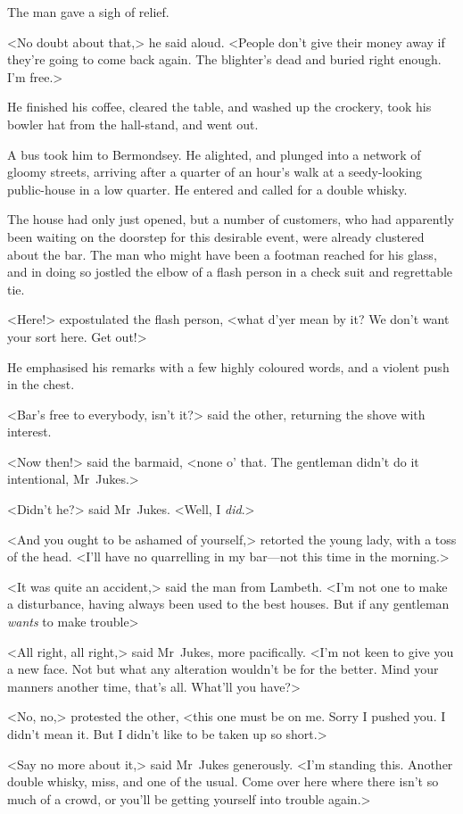 The man gave a sigh of relief.

<No doubt about that,> he said aloud. <People don't give their money away if they're going to come back again. The blighter's dead and buried right enough. I'm free.>

He finished his coffee, cleared the table, and washed up the crockery, took his bowler hat from the hall-stand, and went out.

A bus took him to Bermondsey. He alighted, and plunged into a network of gloomy streets, arriving after a quarter of an hour's walk at a seedy-looking public-house in a low quarter. He entered and called for a double whisky.

The house had only just opened, but a number of customers, who had apparently been waiting on the doorstep for this desirable event, were already clustered about the bar. The man who might have been a footman reached for his glass, and in doing so jostled the elbow of a flash person in a check suit and regrettable tie.

<Here!> expostulated the flash person, <what d'yer mean by it? We don't want your sort here. Get out!>

He emphasised his remarks with a few highly coloured words, and a violent push in the chest.

<Bar's free to everybody, isn't it?> said the other, returning the shove with interest.

<Now then!> said the barmaid, <none o' that. The gentleman didn't do it intentional, Mr~Jukes.>

<Didn't he?> said Mr~Jukes. <Well, I \textit{did}.>

<And you ought to be ashamed of yourself,> retorted the young lady, with a toss of the head. <I'll have no quarrelling in my bar—not this time in the morning.>

<It was quite an accident,> said the man from Lambeth. <I'm not one to make a disturbance, having always been used to the best houses. But if any gentleman \textit{wants} to make trouble\longdash>

<All right, all right,> said Mr~Jukes, more pacifically. <I'm not keen to give you a new face. Not but what any alteration wouldn't be for the better. Mind your manners another time, that's all. What'll you have?>

<No, no,> protested the other, <this one must be on me. Sorry I pushed you. I didn't mean it. But I didn't like to be taken up so short.>

<Say no more about it,> said Mr~Jukes generously. <I'm standing this. Another double whisky, miss, and one of the usual. Come over here where there isn't so much of a crowd, or you'll be getting yourself into trouble again.>

